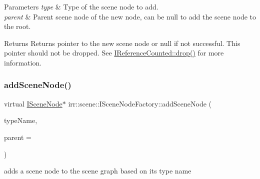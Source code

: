 \begin{DoxyParams}{Parameters}
{\em type} & Type of the scene node to add. \\
\hline
{\em parent} & Parent scene node of the new node, can be null to add the scene node to the root. \\
\hline
\end{DoxyParams}
\begin{DoxyReturn}{Returns}
Returns pointer to the new scene node or null if not successful. This pointer should not be dropped. See \hyperlink{classirr_1_1IReferenceCounted_a03856a09355b89d178090c4a5f738543}{I\+Reference\+Counted\+::drop()} for more information. 
\end{DoxyReturn}
\mbox{\label{classirr_1_1scene_1_1ISceneNodeFactory_a7964a7a29260d7f0d4d052b85df78ffb}} 
\subsubsection{\texorpdfstring{add\+Scene\+Node()}{addSceneNode()}\hspace{0.1cm}{\footnotesize\ttfamily [3/4]}}
{\footnotesize\ttfamily virtual \hyperlink{classirr_1_1scene_1_1ISceneNode}{I\+Scene\+Node}$\ast$ irr\+::scene\+::\+I\+Scene\+Node\+Factory\+::add\+Scene\+Node (\begin{DoxyParamCaption}\item[{const \hyperlink{namespaceirr_a9395eaea339bcb546b319e9c96bf7410}{c8} $\ast$}]{type\+Name,  }\item[{\hyperlink{classirr_1_1scene_1_1ISceneNode}{I\+Scene\+Node} $\ast$}]{parent = {} }\end{DoxyParamCaption})\hspace{0.3cm}{\ttfamily [pure virtual]}}



adds a scene node to the scene graph based on its type name 


